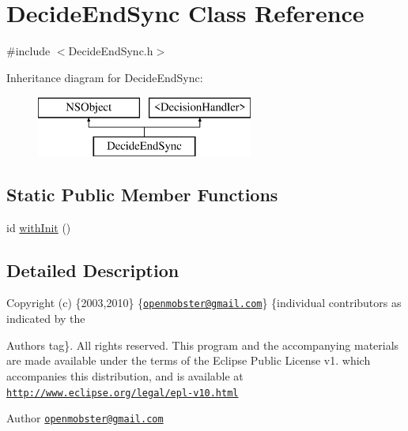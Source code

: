 \hypertarget{interface_decide_end_sync}{
\section{\-Decide\-End\-Sync \-Class \-Reference}
\label{interface_decide_end_sync}
}


{\ttfamily \#include $<$\-Decide\-End\-Sync.\-h$>$}

\-Inheritance diagram for \-Decide\-End\-Sync\-:\begin{figure}[H]
\begin{center}
\leavevmode
\includegraphics[height=2.000000cm]{interface_decide_end_sync}
\end{center}
\end{figure}
\subsection*{\-Static \-Public \-Member \-Functions}
\begin{DoxyCompactItemize}
\item 
id \hyperlink{interface_decide_end_sync_a929e5142dcc5f034e2093503c05bdc8b}{with\-Init} ()
\end{DoxyCompactItemize}


\subsection{\-Detailed \-Description}
\-Copyright (c) \{2003,2010\} \{\href{mailto:openmobster@gmail.com}{\tt openmobster@gmail.\-com}\} \{individual contributors as indicated by the \begin{DoxyAuthor}{\-Authors}
tag\}. \-All rights reserved. \-This program and the accompanying materials are made available under the terms of the \-Eclipse \-Public \-License v1. which accompanies this distribution, and is available at \href{http://www.eclipse.org/legal/epl-v10.html}{\tt http\-://www.\-eclipse.\-org/legal/epl-\/v10.\-html}
\end{DoxyAuthor}
\begin{DoxyAuthor}{\-Author}
\href{mailto:openmobster@gmail.com}{\tt openmobster@gmail.\-com} 
\end{DoxyAuthor}


